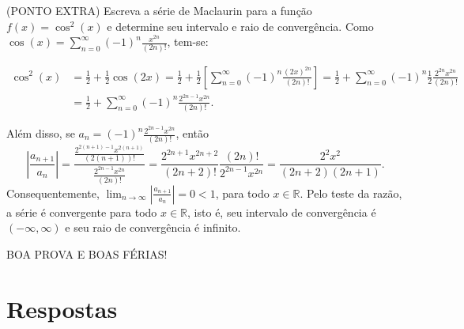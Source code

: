 \documentclass[12pt,a4paper]{article}
\newcommand*\R{\mathbb{R}}
\begin{document}
\begin{ExerciseList}
\Exercise[title={2,0}] (PONTO EXTRA) Escreva a série de Maclaurin para a função $f(x) = \cos^2(x)$ e determine seu intervalo e raio de convergência.
\Answer Como $\cos(x) = \sum_{n=0}^\infty (-1)^{n} \frac{x^{2n}}{(2n)!}$, tem-se:

\begin{align*}
    \cos^2(x)
    & = \frac{1}{2} + \frac{1}{2}\cos(2 x)
      = \frac{1}{2} + \frac{1}{2} \left[\sum_{n=0}^\infty (-1)^{n} \frac{(2x)^{2n}}{(2n)!}\right]
      = \frac{1}{2} + \sum_{n=0}^\infty (-1)^{n} \frac{1}{2} \frac{2^{2n} x^{2n}}{(2n)!} \\
    & = \frac{1}{2} + \sum_{n=0}^\infty (-1)^{n} \frac{2^{2n-1} x^{2n}}{(2n)!}.
\end{align*}

Além disso, se $a_n = (-1)^{n} \frac{2^{2n-1} x^{2n}}{(2n)!}$, então
\[
\left|\frac{a_{n+1}}{a_{n}}\right|
= \frac{\frac{2^{2(n+1)-1} x^{2(n+1)}}{(2(n+1))!}}{\frac{2^{2n-1} x^{2n}}{(2n)!}}
= \frac{2^{2n+1} x^{2n+2}}{(2n+2)!} \frac{(2n)!}{2^{2n-1} x^{2n}}
= \frac{2^2 x^2}{(2n+2)(2n+1)}.
\]
Consequentemente, $\lim_{n\to \infty} \left|\frac{a_{n+1}}{a_{n}}\right| = 0 < 1$, para todo $x \in \R$. Pelo teste da razão, a série é convergente para todo $x \in \R$, isto é, seu intervalo de convergência é $(-\infty, \infty)$ e seu raio de convergência é infinito.

\end{ExerciseList}

\begin{center}
BOA PROVA E BOAS FÉRIAS!
\end{center}

\newpage
\restoregeometry
\section*{Respostas}
\shipoutAnswer
\end{document}
